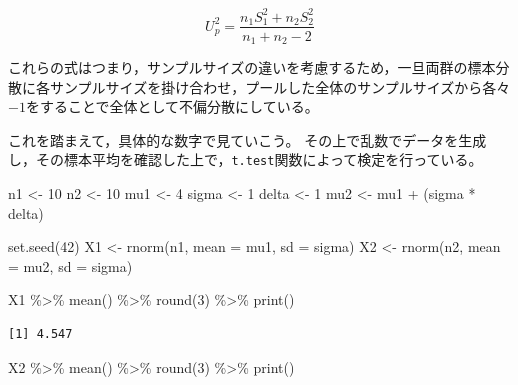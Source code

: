 \documentclass[
  a4paper,
]{ltjsbook}
\newenvironment{Shaded}{\begin{snugshade}}{\end{snugshade}}
\newcommand{\AttributeTok}[1]{\textcolor[rgb]{0.40,0.45,0.13}{#1}}
\newcommand{\DecValTok}[1]{\textcolor[rgb]{0.68,0.00,0.00}{#1}}
\newcommand{\FunctionTok}[1]{\textcolor[rgb]{0.28,0.35,0.67}{#1}}
\newcommand{\NormalTok}[1]{\textcolor[rgb]{0.00,0.23,0.31}{#1}}
\newcommand{\OtherTok}[1]{\textcolor[rgb]{0.00,0.23,0.31}{#1}}
\newcommand{\SpecialCharTok}[1]{\textcolor[rgb]{0.37,0.37,0.37}{#1}}
\begin{document}
\[ U^2_p = \frac{n_1S^2_1+ n_2S^2_2}{n_1 + n_2 -2} \]

これらの式はつまり，サンプルサイズの違いを考慮するため，一旦両群の標本分散に各サンプルサイズを掛け合わせ，プールした全体のサンプルサイズから各々\(-1\)をすることで全体として不偏分散にしている。

これを踏まえて，具体的な数字で見ていこう。
その上で乱数でデータを生成し，その標本平均を確認した上で，\texttt{t.test}関数によって検定を行っている。

\begin{Shaded}
\begin{Highlighting}[]
\NormalTok{n1 }\OtherTok{\textless{}{-}} \DecValTok{10}
\NormalTok{n2 }\OtherTok{\textless{}{-}} \DecValTok{10}
\NormalTok{mu1 }\OtherTok{\textless{}{-}} \DecValTok{4}
\NormalTok{sigma }\OtherTok{\textless{}{-}} \DecValTok{1}
\NormalTok{delta }\OtherTok{\textless{}{-}} \DecValTok{1}
\NormalTok{mu2 }\OtherTok{\textless{}{-}}\NormalTok{ mu1 }\SpecialCharTok{+}\NormalTok{ (sigma }\SpecialCharTok{*}\NormalTok{ delta)}

\FunctionTok{set.seed}\NormalTok{(}\DecValTok{42}\NormalTok{)}
\NormalTok{X1 }\OtherTok{\textless{}{-}} \FunctionTok{rnorm}\NormalTok{(n1, }\AttributeTok{mean =}\NormalTok{ mu1, }\AttributeTok{sd =}\NormalTok{ sigma)}
\NormalTok{X2 }\OtherTok{\textless{}{-}} \FunctionTok{rnorm}\NormalTok{(n2, }\AttributeTok{mean =}\NormalTok{ mu2, }\AttributeTok{sd =}\NormalTok{ sigma)}

\NormalTok{X1 }\SpecialCharTok{\%\textgreater{}\%}
  \FunctionTok{mean}\NormalTok{() }\SpecialCharTok{\%\textgreater{}\%}
  \FunctionTok{round}\NormalTok{(}\DecValTok{3}\NormalTok{) }\SpecialCharTok{\%\textgreater{}\%}
  \FunctionTok{print}\NormalTok{()}
\end{Highlighting}
\end{Shaded}

\begin{verbatim}
[1] 4.547
\end{verbatim}

\begin{Shaded}
\begin{Highlighting}[]
\NormalTok{X2 }\SpecialCharTok{\%\textgreater{}\%}
  \FunctionTok{mean}\NormalTok{() }\SpecialCharTok{\%\textgreater{}\%}
  \FunctionTok{round}\NormalTok{(}\DecValTok{3}\NormalTok{) }\SpecialCharTok{\%\textgreater{}\%}
  \FunctionTok{print}\NormalTok{()}
\end{Highlighting}
\end{Shaded}
\end{document}
